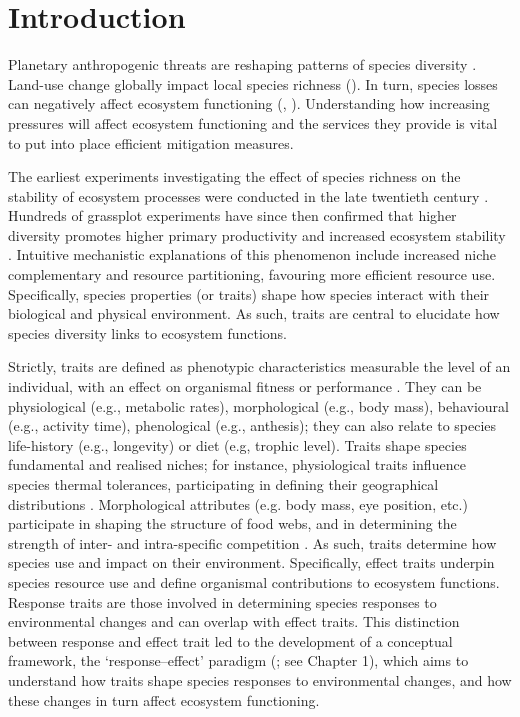 \section{Introduction}
Planetary anthropogenic threats are reshaping patterns of species diversity \citep{ Spooner2018, Bohm2013, Schipper2008, Stuart2004}. Land-use change globally impact local species richness (\cite{Newbold2015}). In turn, species losses can negatively affect ecosystem functioning (\cite{Hooper2005}, \cite{Hooper2012}). Understanding how increasing pressures will affect ecosystem functioning and the services they provide is vital to put into place efficient mitigation measures.
   
The earliest experiments investigating the effect of species richness on the stability of ecosystem processes were conducted in the late twentieth century \citep{Tilman1994, Naeem1994}. Hundreds of grassplot experiments have since then confirmed that higher diversity promotes higher primary productivity and increased ecosystem stability \citep{Tilman2014, Balvanera2006}. Intuitive mechanistic explanations of this phenomenon include increased niche complementary and resource partitioning, favouring more efficient resource use. Specifically, species properties (or traits) shape how species interact with their biological and physical environment. As such, traits are central to elucidate how species diversity links to ecosystem functions. 

Strictly, traits are defined as phenotypic characteristics measurable the level of an individual, with an effect on organismal fitness or performance \citep{McGill2006, Violle2007}. They can be physiological (e.g., metabolic rates), morphological (e.g., body mass), behavioural (e.g., activity time), phenological (e.g., anthesis); they can also relate to species life-history (e.g., longevity) or diet (e.g, trophic level).
Traits shape species fundamental and realised niches; for instance, physiological traits influence species thermal tolerances, participating in defining their geographical distributions \citep{Calosi2010, Khaliq2017}. Morphological attributes (e.g. body mass, eye position, etc.) participate in shaping the structure of food webs, and in determining the strength of inter- and intra-specific competition \citep{Gravel2016, Laigle2018}. As such, traits determine how species use and impact on their environment. Specifically, effect traits underpin species resource use and define organismal contributions to ecosystem functions. Response traits are those involved in determining species responses to environmental changes and can overlap with effect traits. This distinction between response and effect trait led to the development of a conceptual framework, the `response--effect' paradigm (\cite{Lavorel2002,Luck2012}; see Chapter 1), which aims to understand how traits shape species responses to environmental changes, and how these changes in turn affect ecosystem functioning. 

